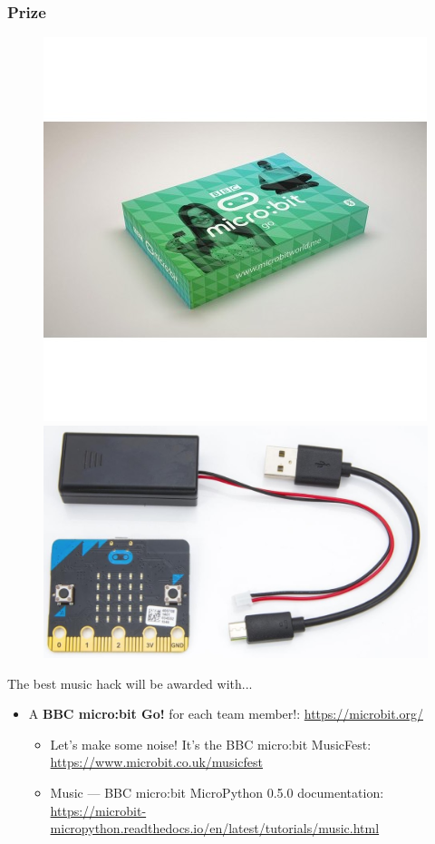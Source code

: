 \documentclass[screen, aspectratio=43]{beamer}
\begin{document}
\begin{frame}
  \frametitle{Prize}
  \begin{figure}
	\includegraphics[scale=0.3]{img/microbit-go-main_5_1.jpg}
	\includegraphics[scale=0.1]{img/microbit-go.jpg}
  \end{figure}
  The best music hack will be awarded with...
    \begin{itemize}
    	\item A  \textbf{BBC micro:bit Go!} for each team member!: \url{https://microbit.org/}
	\begin{itemize}
		\item Let's make some noise! It's the BBC micro:bit MusicFest: \\
		\url{https://www.microbit.co.uk/musicfest}
		\item Music — BBC micro:bit MicroPython 0.5.0 documentation:\\ 
		\url{https://microbit-micropython.readthedocs.io/en/latest/tutorials/music.html}
	\end{itemize}
    \end{itemize}
\end{frame}
\end{document}
